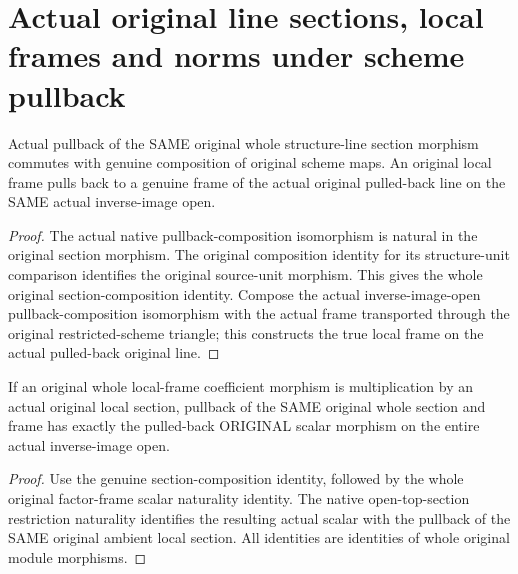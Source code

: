 \section{Actual original line sections, local frames and norms under scheme pullback}

\begin{lemma}
\label{lem:fc-original-section-pullback-frame}
\leanok
{}
Actual pullback of the SAME original whole structure-line section morphism
commutes with genuine composition of original scheme maps.  An original
local frame pulls back to a genuine frame of the actual original pulled-back
line on the SAME actual inverse-image open.
\end{lemma}
\begin{proof}
The actual native pullback-composition isomorphism is natural in the
original section morphism.  The original composition identity for its
structure-unit comparison identifies the original source-unit morphism.
This gives the whole original section-composition identity.  Compose the
actual inverse-image-open pullback-composition isomorphism with the actual
frame transported through the original restricted-scheme triangle; this
constructs the true local frame on the actual pulled-back original line.
\end{proof}

\begin{lemma}
\label{lem:fc-original-section-pullback-scalar}
\leanok
{}
If an original whole local-frame coefficient morphism is multiplication by
an actual original local section, pullback of the SAME original whole
section and frame has exactly the pulled-back ORIGINAL scalar morphism on
the entire actual inverse-image open.
\end{lemma}
\begin{proof}
Use the genuine section-composition identity, followed by the whole
original factor-frame scalar naturality identity.  The native
open-top-section restriction naturality identifies the resulting actual
scalar with the pullback of the SAME original ambient local section.
All identities are identities of whole original module morphisms.
\end{proof}

